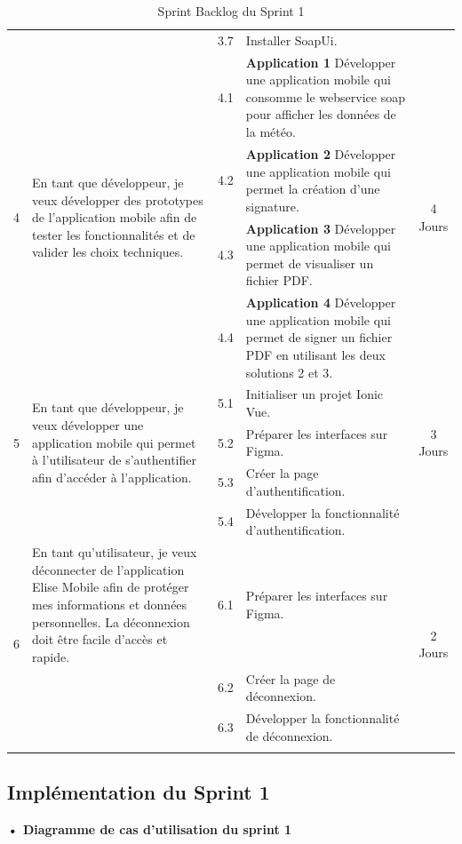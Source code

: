 \begin{adjustwidth}{-1cm}{}
\begin{longtable}{|c|p{6cm}|c|p{6cm}|c|}
    \cline{3-4}
    &  &  3.7 &Installer SoapUi.&\\
    \cline{1-5}
    \multirow{4}{*}{4} & \multirow{4}{6cm}{En tant que développeur, je veux développer des prototypes de l'application mobile afin de tester les fonctionnalités et de valider les choix techniques.} &  4.1 &\textbf{Application 1} Développer une application mobile qui consomme le webservice soap pour afficher les données de la météo.&\multirow{4}{2cm}{4 Jours}\\
    \cline{3-4}
    &  &  4.2 &\textbf{Application 2} Développer une application mobile qui permet la création d'une signature.&\\
    \cline{3-4}
    &  &  4.3 &\textbf{Application 3} Développer une application mobile qui permet de visualiser un fichier PDF.&\\
    \cline{3-4}
    &  &  4.4 &\textbf{Application 4} Développer une application mobile qui permet de signer un fichier PDF en utilisant les deux solutions 2 et 3.&\\
    \cline{1-5}
    \multirow{3}{*}{5} & \multirow{3}{6cm}{En tant que développeur, je veux développer une application mobile qui permet à l'utilisateur de s'authentifier afin d'accéder à l'application.} & 
    
    5.1 &Initialiser un projet Ionic Vue.&\multirow{3}{2cm}{3 Jours}\\
    \cline{3-4}
      & & 5.2 & Préparer les interfaces sur Figma.&\\
    \cline{3-4}
    &  &  5.3 & Créer la page d'authentification. &\\
    \cline{3-4}
    &  &  5.4 & Développer la fonctionnalité d'authentification.&\\
  \hline
  \multirow{3}{*}{6} & En tant qu'utilisateur, je veux déconnecter de l'application Elise Mobile afin de protéger mes informations et données personnelles. La déconnexion doit être facile d'accès et rapide. &  6.1 &Préparer les interfaces sur Figma.&\multirow{3}{2cm}{2 Jours}\\
  \cline{3-4}
  &  &  6.2 &Créer la page de déconnexion.&\\
  \cline{3-4}
  &  &  6.3 &Développer la fonctionnalité de déconnexion.&\\
  \hline
  \caption{Sprint Backlog du Sprint 1}
  \label{tab:sprint-backlog-1}
\end{longtable}
\end{adjustwidth}
\subsection{Implémentation du Sprint 1}
\textbf{•	Diagramme de cas d'utilisation du sprint 1}

